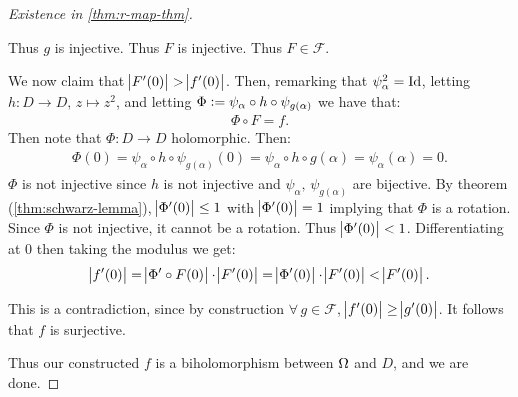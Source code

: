 \begin{proof}[Existence in \ref{thm:r-map-thm}]
\begin{enumerate}
Thus $g$ is injective. Thus $F$ is injective. Thus $F \in \mathscr{F}$.

We now claim that $\abs{F'(0)} > \abs{f'(0)}$. Then, remarking that $\psi_\alpha^2 = \mathrm{Id}$, letting $h: D \to D, \, z \mapsto z^2$, and letting $\Phi \vcentcolon = \psi_\alpha \circ h \circ \psi_{g(\alpha)}$ we have that:
\begin{align*}
    \Phi \circ F =   f.
\end{align*}
 Then note that $\Phi: D \to D$ holomorphic. Then:
 \begin{align*}
     \Phi ( 0) = \psi_\alpha \circ h \circ \psi_{g(\alpha)} (0) = \psi_\alpha \circ h \circ g(\alpha) = \psi_\alpha (\alpha) = 0.
 \end{align*}
 $\Phi$ is not injective since $h$ is not injective and $\psi_\alpha, \, \psi_{g(\alpha)}$ are bijective. By theorem (\ref{thm:schwarz-lemma}), $\abs{\Phi ' (0) } \leq 1$ with $\abs{\Phi ' (0) } = 1$ implying that $\Phi$ is a rotation. Since $\Phi$ is not injective, it cannot be a rotation. Thus $\abs{\Phi ' (0) } < 1$. Differentiating at $0$ then taking the modulus we get:
 \begin{align*}
     \abs{f'(0)} = \abs{\Phi ' \circ F(0)} \cdot \abs{F'(0)} = \abs{\Phi ' (0)} \cdot \abs{F'(0)} < \abs{F'(0)}.
 \end{align*}
 
 This is a contradiction, since by construction $\forall \, g \in \mathscr{F}$, $\abs{f'(0)} \geq \abs{g'(0)}$. It follows that $f$ is surjective.
 
\end{enumerate}

Thus our constructed $f$ is a biholomorphism between $\Omega$ and $D$, and we are done.

\end{proof}

